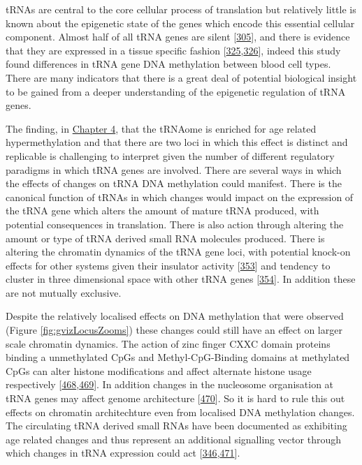 \documentclass[
]{book}
\begin{document}
tRNAs are central to the core cellular process of translation but relatively little is known about the epigenetic state of the genes which encode this essential cellular component.
Almost half of all tRNA genes are silent {[}\protect\hyperlink{ref-Torres2019a}{305}{]}, and there is evidence that they are expressed in a tissue specific fashion {[}\protect\hyperlink{ref-Dittmar2006}{325},\protect\hyperlink{ref-Sagi2016}{326}{]}, indeed this study found differences in tRNA gene DNA methylation between blood cell types.
There are many indicators that there is a great deal of potential biological insight to be gained from a deeper understanding of the epigenetic regulation of tRNA genes.

The finding, in \protect\hyperlink{tRNAs}{Chapter 4}, that the tRNAome is enriched for age related hypermethylation and that there are two loci in which this effect is distinct and replicable is challenging to interpret given the number of different regulatory paradigms in which tRNA genes are involved.
There are several ways in which the effects of changes on tRNA DNA methylation could manifest.
There is the canonical function of tRNAs in which changes would impact on the expression of the tRNA gene which alters the amount of mature tRNA produced, with potential consequences in translation.
There is also action through altering the amount or type of tRNA derived small RNA molecules produced.
There is altering the chromatin dynamics of the tRNA gene loci, with potential knock-on effects for other systems given their insulator activity {[}\protect\hyperlink{ref-Raab2011}{353}{]} and tendency to cluster in three dimensional space with other tRNA genes {[}\protect\hyperlink{ref-VanBortle2017}{354}{]}.
In addition these are not mutually exclusive.

Despite the relatively localised effects on DNA methylation that were observed (Figure \ref{fig:gvizLocusZooms}) these changes could still have an effect on larger scale chromatin dynamics. The action of zinc finger CXXC domain proteins binding a unmethylated CpGs and Methyl-CpG-Binding domains at methylated CpGs can alter histone modifications and affect alternate histone usage respectively {[}\protect\hyperlink{ref-Blackledge2013}{468},\protect\hyperlink{ref-Sijacic2019}{469}{]}.
In addition changes in the nucleosome organisation at tRNA genes may affect genome architecture {[}\protect\hyperlink{ref-Hamdani2019}{470}{]}.
So it is hard to rule this out effects on chromatin architechture even from localised DNA methylation changes.
The circulating tRNA derived small RNAs have been documented as exhibiting age related changes and thus represent an additional signalling vector through which changes in tRNA expression could act {[}\protect\hyperlink{ref-Dhahbi2013}{346},\protect\hyperlink{ref-Rounge2018}{471}{]}.
\end{document}
